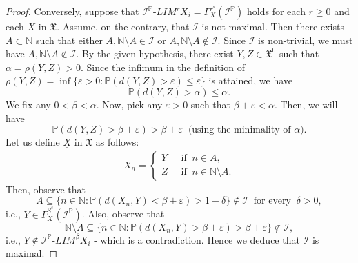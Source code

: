 \documentclass[10pt,a4paper]{amsart}
\begin{document}
\begin{proof}
	Conversely, suppose that $\mathcal{I}^{\mathbb{P}}$-$LIM^rX_i=\Gamma^{r^s}_{\underline{X}}(\mathcal{I}^{\mathbb{P}})$ holds for each $r\geq 0$ and each $\underline{X}$ in $\mathfrak{X}$.
Assume, on the contrary, that $\mathcal{I}$ is not maximal. Then there exists $A\subset\mathbb{N}$ such that either $A,\mathbb{N}\setminus A\in\mathcal{I}$ or $A,\mathbb{N}\setminus A\notin\mathcal{I}$. Since $\mathcal{I}$ is non-trivial, we must have $A,\mathbb{N}\setminus A\notin\mathcal{I}$. By the given hypothesis, there exist $Y,Z\in \mathfrak{X}^0$ such that $\alpha=\rho(Y,Z)>0$. Since the infimum in the definition of $\rho(Y,Z)=\inf \{\varepsilon>0:\mathbb{P}(d(Y,Z)>\varepsilon)\leq\varepsilon\}$ is attained, we have 
$$
\mathbb{P}(d(Y,Z)>\alpha)\leq\alpha.
$$
We fix any $0<\beta<\alpha$. 
Now, pick any $\varepsilon>0$ such that $\beta+\varepsilon<\alpha$.
Then, we will have 
$$
\mathbb{P}(d(Y,Z)>\beta+\varepsilon)>\beta+\varepsilon~\mbox{ (using the minimality of $\alpha$)}.
$$
Let us define $\underline{X}$ in $\mathfrak{X}$ as follows:
\begin{align*}
	X_n=
	\begin{cases}
		Y~&\mbox{ if }~ n\in A,\\
		Z ~&\mbox{ if }~n\in \mathbb{N}\setminus A.
	\end{cases}
\end{align*}
Then, observe that 
$$
A\subseteq\{n\in\mathbb{N}:\mathbb{P}(d(X_n,Y)<\beta+\varepsilon)>1-\delta\}\notin\mathcal{I}~\mbox{ for every }~\delta>0,
$$
i.e., $Y\in\Gamma^{\beta^s}_{\underline{X}}(\mathcal{I}^{\mathbb{P}})$. Also, observe that 
$$
\mathbb{N}\setminus A\subseteq\{n\in\mathbb{N}:\mathbb{P}(d(X_n,Y)>\beta+\varepsilon)>\beta+\varepsilon\}\notin\mathcal{I},
$$
i.e., $Y\notin \mathcal{I}^{\mathbb{P}}$-$LIM^{\beta}X_i$ - which is a contradiction. Hence we deduce that $\mathcal{I}$ is maximal.
\end{proof}
\end{document}

